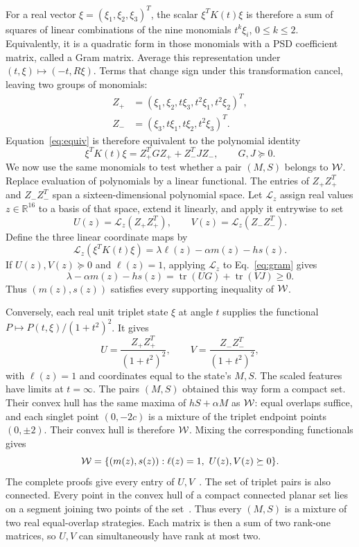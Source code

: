 \documentclass[aps,prl,reprint,superscriptaddress,nofootinbib,longbibliography]{revtex4-2}
\begin{document}
For a real vector $\xi=(\xi_1,\xi_2,\xi_3)^T$, the scalar
$\xi^TK(t)\xi$ is therefore a sum of squares of linear combinations
of the nine monomials $t^k\xi_i$, $0\le k\le2$. Equivalently, it is
a quadratic form in those monomials with a PSD coefficient matrix,
called a Gram matrix. Average this representation under
$(t,\xi)\mapsto(-t,R\xi)$. Terms that change sign under this transformation cancel,
leaving two groups of monomials:
\[
\begin{aligned}
 Z_+&=(\xi_1,\xi_2,t\xi_3,t^2\xi_1,t^2\xi_2)^T,\\
 Z_-&=(\xi_3,t\xi_1,t\xi_2,t^2\xi_3)^T.
\end{aligned}
\]
Equation~\eqref{eq:equiv} is therefore equivalent to the polynomial identity
\begin{equation}
 \xi^TK(t)\xi=Z_+^TGZ_++Z_-^TJZ_-,
 \qquad G,J\succeq0 .
 \label{eq:gram}
\end{equation}
We now use the same monomials to test whether a pair $(M,S)$ belongs
to $\mathcal W$. Replace evaluation of polynomials by a linear functional. The entries of
$Z_+Z_+^T$ and $Z_-Z_-^T$ span a sixteen-dimensional polynomial
space. Let $\mathcal L_z$ assign real values $z\in\mathbb R^{16}$
to a basis of that space, extend it linearly, and apply it entrywise to set
\[
 U(z)=\mathcal L_z(Z_+Z_+^T),\qquad
 V(z)=\mathcal L_z(Z_-Z_-^T).
\]
Define the three linear coordinate maps by
\[
 \mathcal L_z(\xi^TK(t)\xi)
 =\lambda\ell(z)-\alpha m(z)-hs(z).
\]
If $U(z),V(z)\succeq0$ and $\ell(z)=1$, applying
$\mathcal L_z$ to Eq.~\eqref{eq:gram} gives
\begin{equation}
 \lambda-\alpha m(z)-hs(z)
 =\operatorname{tr}(UG)+\operatorname{tr}(VJ)\ge0.
 \label{eq:pairing}
\end{equation}
Thus $(m(z),s(z))$ satisfies every supporting inequality of $\mathcal W$.

Conversely, each real unit triplet state $\xi$ at angle $t$ supplies
the functional $P\mapsto P(t,\xi)/(1+t^2)^2$. It gives
\begin{equation}
 U=\frac{Z_+Z_+^T}{(1+t^2)^2},\qquad
 V=\frac{Z_-Z_-^T}{(1+t^2)^2},
 \label{eq:witness}
\end{equation}
with $\ell(z)=1$ and coordinates equal to the state's $M,S$. The scaled features have limits at $t=\infty$.
The pairs $(M,S)$ obtained this way form a compact set. Their convex
hull has the same maxima of $hS+\alpha M$ as $\mathcal W$: equal overlaps
suffice, and each
singlet point $(0,-2c)$ is a mixture of the triplet endpoint
points $(0,\pm2)$. Their convex hull is therefore $\mathcal W$.
Mixing the corresponding functionals gives
\begin{equation}
 \mathcal W=\{(m(z),s(z)):\ell(z)=1,\ U(z),V(z)\succeq0\}.
 \label{eq:lift}
\end{equation}
The complete proofs give every entry of $U,V$~\cite{SM}. The set of
triplet pairs is also connected. Every point in the convex hull of a
compact connected planar set lies on a segment joining two points of
the set~\cite{SM}. Thus every $(M,S)$ is a mixture of two real
equal-overlap strategies. Each matrix is then a sum of two rank-one
matrices, so $U,V$ can simultaneously have rank at most two.
\end{document}
